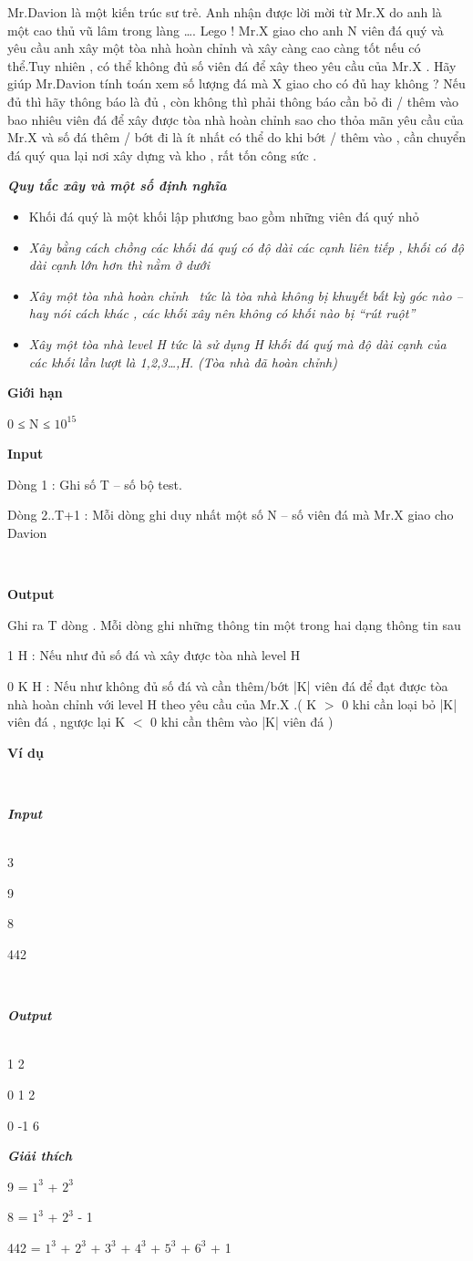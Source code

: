 

Mr.Davion là một kiến trúc sư trẻ. Anh nhận được lời mời từ Mr.X do anh là một cao thủ vũ lâm trong làng …. Lego ! Mr.X giao cho anh N viên đá quý và yêu cầu anh xây một tòa nhà hoàn chỉnh và xây càng cao càng tốt nếu có thể.Tuy nhiên , có thể không đủ số viên đá để xây theo yêu cầu của Mr.X . Hãy giúp Mr.Davion tính toán xem số lượng đá mà X giao cho có đủ hay không ? Nếu đủ thì hãy thông báo là đủ , còn không thì phải thông báo cần bỏ đi / thêm vào bao nhiêu viên đá để xây được tòa nhà hoàn chỉnh sao cho thỏa mãn yêu cầu của Mr.X và số đá thêm / bớt đi là ít nhất có thể do khi bớt / thêm vào , cần chuyển đá quý qua lại nơi xây dựng và kho , rất tốn công sức .

\textbf{\emph{Quy tắc xây và một số định nghĩa }}
\begin{itemize}
	\item Khối đá quý là một khối lập phương bao gồm những viên đá quý nhỏ \emph{}
	\item \emph{Xây bằng cách chồng các khối đá quý có độ dài các cạnh liên tiếp , khối có độ dài cạnh lớn hơn thì nằm ở dưới}
	\item \emph{Xây một tòa nhà hoàn chỉnh  tức là tòa nhà không bị khuyết bất kỳ góc nào – hay nói cách khác , các khối xây nên không có khối nào bị “rút ruột”}
	\item \emph{Xây một tòa nhà level H tức là sử dụng H khối đá quý mà độ dài cạnh của các khối lần lượt là 1,2,3…,H. (Tòa nhà đã hoàn chỉnh)}
\end{itemize}

\textbf{Giới hạn }

0 ≤ N ≤ $10^{15}$

\textbf{Input }

Dòng 1 : Ghi số T – số bộ test.

Dòng 2..T+1 : Mỗi dòng ghi duy nhất một số N – số viên đá mà Mr.X giao cho Davion

 

\textbf{Output }

Ghi ra T dòng . Mỗi dòng ghi những thông tin một trong hai dạng thông tin sau

1 H : Nếu như đủ số đá và xây được tòa nhà level H

0 K H : Nếu như không đủ số đá và cần thêm/bớt |K| viên đá để đạt được tòa nhà hoàn chỉnh với level H theo yêu cầu của Mr.X .( K $>$ 0 khi cần loại bỏ |K| viên đá , ngược lại K $<$ 0 khi cần thêm vào |K| viên đá )

\textbf{Ví dụ }

 

\textbf{\emph{Input }}
\\ 

3

9

8

442

 

\textbf{\emph{Output }}
\\ 

1 2

0 1 2

0 -1 6

\emph{\textbf{Giải thích }}

9 = $1^{3}$ + $2^{3}$

8 = $1^{3}$ + $2^{3}$ - 1

442 = $1^{3}$ + $2^{3}$ + $3^{3}$ + $4^{3}$ + $5^{3}$ + $6^{3}$ + 1
